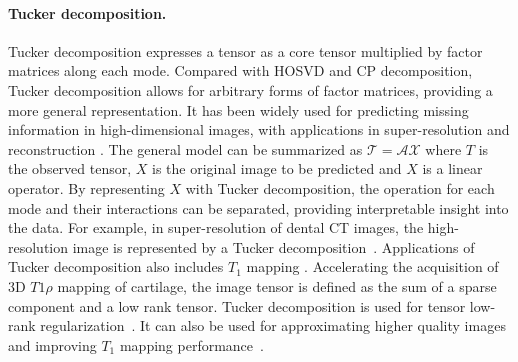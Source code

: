 \paragraph{Tucker decomposition.}
Tucker decomposition expresses a tensor as a core tensor multiplied by factor matrices along each mode. Compared with HOSVD and CP decomposition, Tucker decomposition allows for arbitrary forms of factor matrices, providing a more general representation. It has been widely used for predicting missing information in high-dimensional images, with applications in super-resolution \cite{gui2017brain, jia2022nonconvex, hatvaniy2021single} and reconstruction \cite{wu2018multiple, wang2021spectral, li2018efficient}. The general model can be summarized as $\mathcal{T} = \mathcal{A}\mathcal{X} $ where $T$ is the observed tensor, $X$ is the original image to be predicted and $X$ is a linear operator. By representing $X$ with Tucker decomposition, the operation for each mode and their interactions can be separated, providing interpretable insight into the data. For example, in super-resolution of dental CT images, the high-resolution image is represented by a Tucker decomposition~\cite{hatvaniy2021single}. Applications of Tucker decomposition also includes 
$T_1$ mapping \cite{liu2021accelerating, yaman2019low}. Accelerating the acquisition of 3D $T{1\rho}$ mapping of cartilage, the image tensor is defined as the sum of a sparse component and a low rank tensor. Tucker decomposition is used for tensor low-rank regularization~\cite{liu2021accelerating}. It can also be used for approximating higher quality images and improving $T_1$ mapping performance~\cite{yaman2019low}.  



